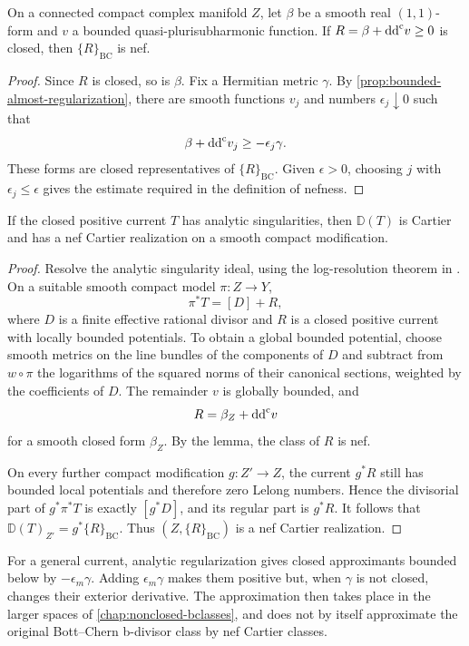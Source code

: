\begin{lemma}\label{lem:bounded-closed-potential-nef}
On a connected compact complex manifold $Z$, let $\beta$ be a smooth real $(1,1)$-form and $v$ a bounded quasi-plurisubharmonic function. If $R=\beta+\mathrm{dd}^{\mathrm{c}} v\geq0$ is closed, then $\{R\}_{\mathrm{BC}}$ is nef.
\end{lemma}
\begin{proof}
Since $R$ is closed, so is $\beta$. Fix a Hermitian metric $\gamma$. By \cref{prop:bounded-almost-regularization}, there are smooth functions $v_j$ and numbers $\epsilon_j\downarrow0$ such that
\[
 \beta+\mathrm{dd}^{\mathrm{c}} v_j\geq-\epsilon_j\gamma.
\]
These forms are closed representatives of $\{R\}_{\mathrm{BC}}$. Given $\epsilon>0$, choosing $j$ with $\epsilon_j\leq\epsilon$ gives the estimate required in the definition of nefness.
\end{proof}

\begin{theorem}\label{thm:analytic-current-nef-cartier}
If the closed positive current $T$ has analytic singularities, then $\mathbb D(T)$ is Cartier and has a nef Cartier realization on a smooth compact modification.
\end{theorem}
\begin{proof}
Resolve the analytic singularity ideal, using the log-resolution theorem in \cite[Theorem~1.6.1]{SGPT}. On a suitable smooth compact model $\pi\colon Z\to Y$,
\[
 \pi^*T=[D]+R,
\]
where $D$ is a finite effective rational divisor and $R$ is a closed positive current with locally bounded potentials. To obtain a global bounded potential, choose smooth metrics on the line bundles of the components of $D$ and subtract from $w\circ\pi$ the logarithms of the squared norms of their canonical sections, weighted by the coefficients of $D$. The remainder $v$ is globally bounded, and
\[
 R=\beta_Z+\mathrm{dd}^{\mathrm{c}} v
\]
for a smooth closed form $\beta_Z$. By the lemma, the class of $R$ is nef.

On every further compact modification $g\colon Z'\to Z$, the current $g^*R$ still has bounded local potentials and therefore zero Lelong numbers. Hence the divisorial part of $g^*\pi^*T$ is exactly $[g^*D]$, and its regular part is $g^*R$. It follows that $\mathbb D(T)_{Z'}=g^*\{R\}_{\mathrm{BC}}$. Thus $(Z,\{R\}_{\mathrm{BC}})$ is a nef Cartier realization.
\end{proof}

For a general current, analytic regularization gives closed approximants bounded below by $-\epsilon_m\gamma$. Adding $\epsilon_m\gamma$ makes them positive but, when $\gamma$ is not closed, changes their exterior derivative. The approximation then takes place in the larger spaces of \cref{chap:nonclosed-bclasses}, and does not by itself approximate the original Bott--Chern b-divisor class by nef Cartier classes.
